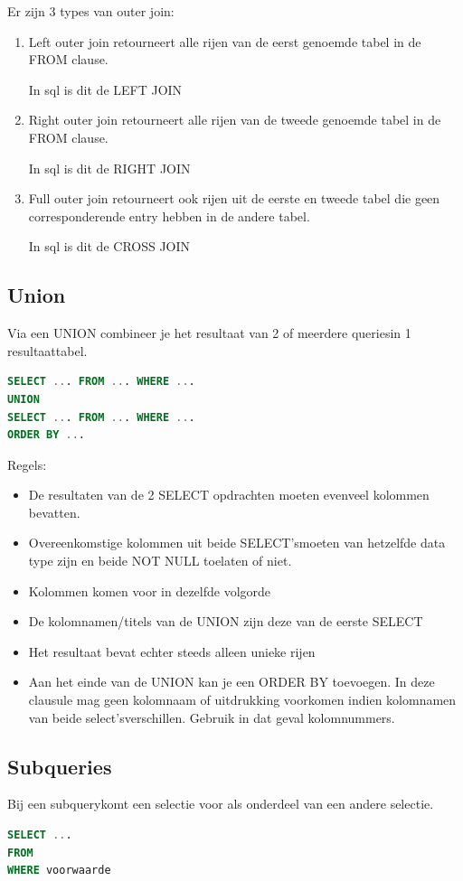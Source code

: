 \documentclass[a4paper,12pt]{article}
\begin{document}
Er zijn 3 types van outer join:
\begin{enumerate}
\item Left outer join retourneert alle rijen van de eerst genoemde tabel in de FROM clause.

In sql is dit de LEFT JOIN
\item Right outer join retourneert alle rijen van de tweede genoemde tabel in de FROM clause.

In sql is dit de RIGHT JOIN
\item Full outer join retourneert ook rijen uit de eerste en tweede tabel die geen corresponderende entry hebben in de andere tabel.

In sql is dit de CROSS JOIN
\end{enumerate}

\subsection{Union}
Via een UNION combineer je het resultaat van 2 of meerdere queriesin 1 resultaattabel.
\begin{lstlisting}[language=sql]
SELECT ... FROM ... WHERE ...
UNION
SELECT ... FROM ... WHERE ...
ORDER BY ...
\end{lstlisting}
Regels:
\begin{itemize}
\item De resultaten van de 2 SELECT opdrachten moeten evenveel kolommen bevatten.
\item Overeenkomstige kolommen uit beide SELECT’smoeten van hetzelfde data type zijn en beide NOT NULL toelaten of niet.
\item Kolommen komen voor in dezelfde volgorde
\item De kolomnamen/titels van de UNION zijn deze van de eerste SELECT
\item Het resultaat bevat echter steeds alleen unieke rijen
\item Aan het einde van de UNION kan je een ORDER BY toevoegen.
In deze clausule mag geen kolomnaam of uitdrukking voorkomen indien kolomnamen van beide select’sverschillen.
Gebruik in dat geval kolomnummers.
\end{itemize}

\subsection{Subqueries}
Bij een subquerykomt een selectie voor als onderdeel van een andere selectie.

\begin{lstlisting}[language=sql]
SELECT ...
FROM
WHERE voorwaarde
\end{lstlisting}
\end{document}
